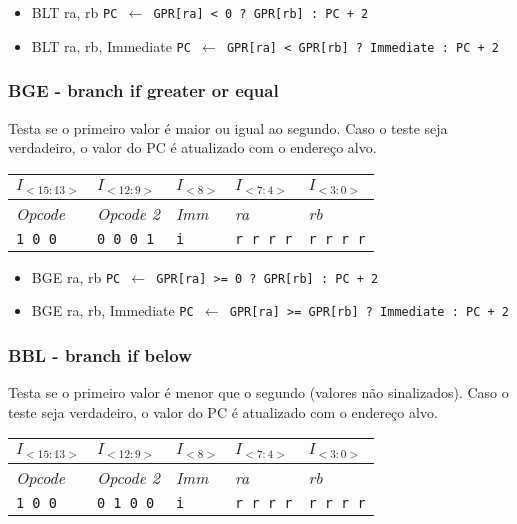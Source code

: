\documentclass[11pt,a4paper]{report}
\begin{document}
\begin{itemize}
\item BLT ra, rb
\subitem \texttt{PC $\leftarrow$ GPR[ra] < 0 ? GPR[rb] : PC + 2}
\item BLT ra, rb, Immediate
\subitem \texttt{PC $\leftarrow$ GPR[ra] < GPR[rb] ? Immediate :  PC + 2}
\end{itemize}

\subsubsection{BGE - branch if greater or equal}
Testa se o primeiro valor é maior ou igual ao segundo. Caso o teste
seja verdadeiro, o valor do PC é atualizado com o endereço alvo.

\begin{table}[htb!]
\centering
\begin{tabular}{|p{2cm}|p{2cm}|p{2cm}|p{2cm}|p{2cm}|}
\hline
$I_{<15:13>}$ & $I_{<12:9>}$ & $I_{<8>}$ & $I_{<7:4>}$ & $I_{<3:0>}$  \\ \hline
\textit{Opcode} & \textit{Opcode 2} & \textit{Imm} & \textit{ra} & \textit{rb} \\ \hline
\texttt{1 0 0} & \texttt{0 0 0 1} & \texttt{i} & \texttt{r r r r} & \texttt{r r r r} \\ \hline
\end{tabular}
\end{table}

\begin{itemize}
\item BGE ra, rb
\subitem \texttt{PC $\leftarrow$ GPR[ra] >= 0 ? GPR[rb] : PC + 2}
\item BGE ra, rb, Immediate
\subitem \texttt{PC $\leftarrow$ GPR[ra] >= GPR[rb] ? Immediate :  PC + 2}
\end{itemize}

\subsubsection{BBL - branch if below}
Testa se o primeiro valor é menor que o segundo (valores não sinalizados).
Caso o teste seja verdadeiro, o valor do PC é atualizado com o endereço
alvo.

\begin{table}[htb!]
\centering
\begin{tabular}{|p{2cm}|p{2cm}|p{2cm}|p{2cm}|p{2cm}|}
\hline
$I_{<15:13>}$ & $I_{<12:9>}$ & $I_{<8>}$ & $I_{<7:4>}$ & $I_{<3:0>}$  \\ \hline
\textit{Opcode} & \textit{Opcode 2} & \textit{Imm} & \textit{ra} & \textit{rb} \\ \hline
\texttt{1 0 0} & \texttt{0 1 0 0} & \texttt{i} & \texttt{r r r r} & \texttt{r r r r} \\ \hline
\end{tabular}
\end{table}
\end{document}
